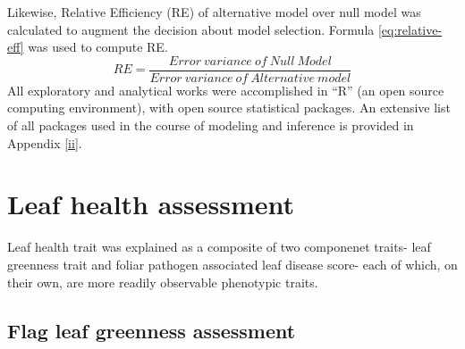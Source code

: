 \documentclass[12pt,oneside]{dukestatscithesis} %
\theoremstyle{definition}
\theoremstyle{definition}
\theoremstyle{definition}
\theoremstyle{remark}
\begin{document}
Likewise, Relative Efficiency (RE) of alternative model over null model
was calculated to augment the decision about model selection. Formula
\eqref{eq:relative-eff} was used to compute RE.
\begin{equation}
RE = \frac{Error\ variance\ of\ Null\ Model}{Error\ variance\ of\ Alternative\ model}
\label{eq:relative-eff}
\end{equation}
All exploratory and analytical works were accomplished in ``R'' (an open
source computing environment), with open source statistical packages. An
extensive list of all packages used in the course of modeling and
inference is provided in Appendix \ref{ii}.

\section{Leaf health assessment}\label{leaf-health}

Leaf health trait was explained as a composite of two componenet traits-
leaf greenness trait and foliar pathogen associated leaf disease score-
each of which, on their own, are more readily observable phenotypic
traits.

\subsection{Flag leaf greenness assessment}\label{greenness}
\end{document}
